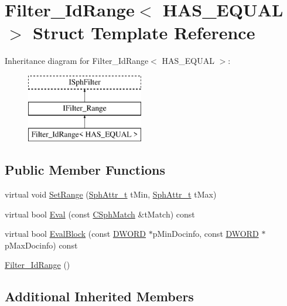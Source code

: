 \hypertarget{structFilter__IdRange}{\section{Filter\-\_\-\-Id\-Range$<$ H\-A\-S\-\_\-\-E\-Q\-U\-A\-L $>$ Struct Template Reference}
\label{structFilter__IdRange}
}
Inheritance diagram for Filter\-\_\-\-Id\-Range$<$ H\-A\-S\-\_\-\-E\-Q\-U\-A\-L $>$\-:\begin{figure}[H]
\begin{center}
\leavevmode
\includegraphics[height=3.000000cm]{structFilter__IdRange}
\end{center}
\end{figure}
\subsection*{Public Member Functions}
\begin{DoxyCompactItemize}
\item 
virtual void \hyperlink{structFilter__IdRange_aeddb39a401e2eb938de4bfcaacb5b7e9}{Set\-Range} (\hyperlink{sphinx_8h_a7c122d91b0b52a0214ba176636bb1561}{Sph\-Attr\-\_\-t} t\-Min, \hyperlink{sphinx_8h_a7c122d91b0b52a0214ba176636bb1561}{Sph\-Attr\-\_\-t} t\-Max)
\item 
virtual bool \hyperlink{structFilter__IdRange_a448ac56b9b25f234858fe75c64951edb}{Eval} (const \hyperlink{classCSphMatch}{C\-Sph\-Match} \&t\-Match) const 
\item 
virtual bool \hyperlink{structFilter__IdRange_a876316a2a8690b8f0c57537bc8fe2eaf}{Eval\-Block} (const \hyperlink{sphinxstd_8h_a798af1e30bc65f319c1a246cecf59e39}{D\-W\-O\-R\-D} $\ast$p\-Min\-Docinfo, const \hyperlink{sphinxstd_8h_a798af1e30bc65f319c1a246cecf59e39}{D\-W\-O\-R\-D} $\ast$p\-Max\-Docinfo) const 
\item 
\hyperlink{structFilter__IdRange_aebc10fa20c8411f76d75cec3e564dc1e}{Filter\-\_\-\-Id\-Range} ()
\end{DoxyCompactItemize}
\subsection*{Additional Inherited Members}


